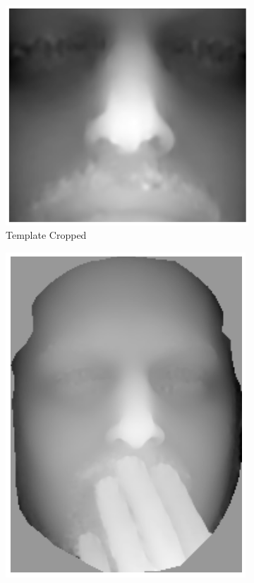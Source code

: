\begin{figure}[t]
\begin{subfigure}[b]{0.2\textwidth}
        \includegraphics[width=\textwidth]{statistical_normals/images/lk2d/bs004_template_cropped.png}
        \caption{Template Cropped}\label{subfig:singl_img_depth_2d_lk_template_cropped}
    \end{subfigure} \hfill
    \begin{subfigure}[b]{0.2\textwidth}
        \includegraphics[width=\textwidth]{statistical_normals/images/lk2d/bs004_occluded.png}

\end{subfigure}
\end{figure}
